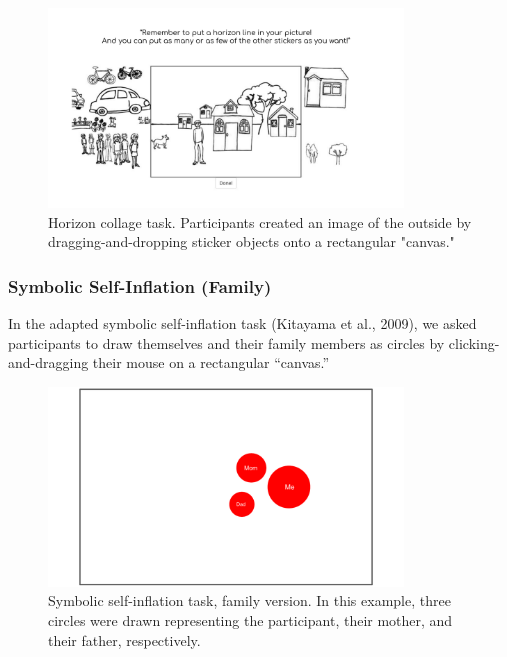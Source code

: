 \documentclass[
  man,floatsintext]{apa6}
\begin{document}
\begin{figure}[!h]

{\centering \includegraphics[width=1\linewidth,height=200px]{CCRR_manuscript_files/appendix_task_examples/e1_horizon} 

}

\caption{Horizon collage task. Participants created an image of the outside by dragging-and-dropping sticker objects onto a rectangular "canvas."}\label{fig:horizon}
\end{figure}

\hypertarget{symbolic-self-inflation-family}{%
\subsubsection{Symbolic Self-Inflation (Family)}\label{symbolic-self-inflation-family}}

In the adapted symbolic self-inflation task (Kitayama et al., 2009), we asked participants to draw themselves and their family members as circles by clicking-and-dragging their mouse on a rectangular ``canvas.''

\begin{figure}[!h]

{\centering \includegraphics[width=1\linewidth,height=200px]{CCRR_manuscript_files/appendix_task_examples/e1_si_family} 

}

\caption{Symbolic self-inflation task, family version. In this example, three circles were drawn representing the participant, their mother, and their father, respectively.}\label{fig:si-family}
\end{figure}
\end{document}
